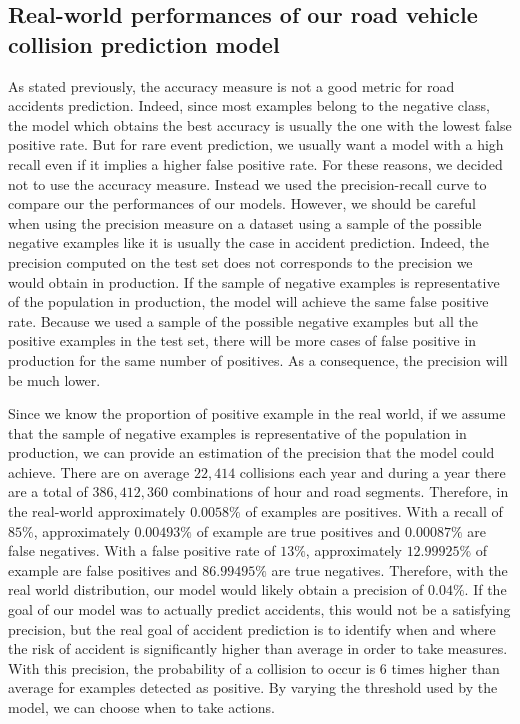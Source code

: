 \documentclass[conference]{IEEEtran}
\begin{document}
\subsection{Real-world performances of our road vehicle collision prediction model}
As stated previously, the accuracy measure is not a good metric for road accidents
prediction. Indeed, since most examples belong to the negative class, the model which obtains
the best accuracy is usually the one with the lowest false positive rate. But for rare event
prediction, we usually want a model with a high recall even if it implies a higher false
positive rate. For these reasons, we decided not to use the accuracy measure. Instead
we used the precision-recall curve to compare our the performances of our models. However, we
should be careful when using the precision measure on a dataset using a sample of the possible
negative examples like it is usually the case in accident prediction. Indeed, the precision
computed on the test set does not corresponds to the precision we would obtain in production.
If the sample of negative examples is representative of the population
in production, the model will achieve the same false positive rate.
Because we used a sample of the possible negative examples but all the 
positive examples in the test set, there will be more cases of false positive in production for the same number of positives. As a consequence, the precision will be much lower.

Since we know the proportion of positive example in the real world, if we assume that the
sample of negative examples is representative of the population in production, we can provide
an estimation of the precision that the model could achieve. There are on average $22,414$ collisions each year and during a year there are a total of $386,412,360$ combinations of hour and road segments. Therefore, in the real-world approximately $0.0058\%$ of examples are positives. With a recall of $85\%$, approximately $0.00493\%$ of example are true positives and $0.00087\%$ are false negatives. With a false positive rate of $13\%$, approximately $12.99925\%$ of example are false positives and $86.99495\%$ are true negatives. Therefore, with the real world distribution, our model would likely obtain a precision of
$0.04\%$. If the goal of our model was to actually predict accidents, this would not be a satisfying precision, but the real goal of accident prediction is to identify when and where the risk of accident is significantly higher than average in order to take measures. With this precision, the probability of a collision to occur is 6 times higher than average for examples detected as positive. By varying the threshold used by the model, we can choose when to take actions.
\end{document}
